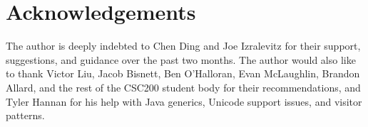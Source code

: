 \documentclass{article}
\begin{document}
\section{Acknowledgements}

The author is deeply indebted to Chen Ding and Joe Izralevitz for their support, suggestions, and guidance over the past two months.
The author would also like to thank Victor Liu, Jacob Bisnett, Ben O'Halloran, Evan McLaughlin, Brandon Allard, and the rest of
the CSC200 student body for their recommendations, and Tyler Hannan for his help with Java generics, Unicode support issues, and
visitor patterns.



\pagebreak
\pagestyle{empty}



\end{document}
